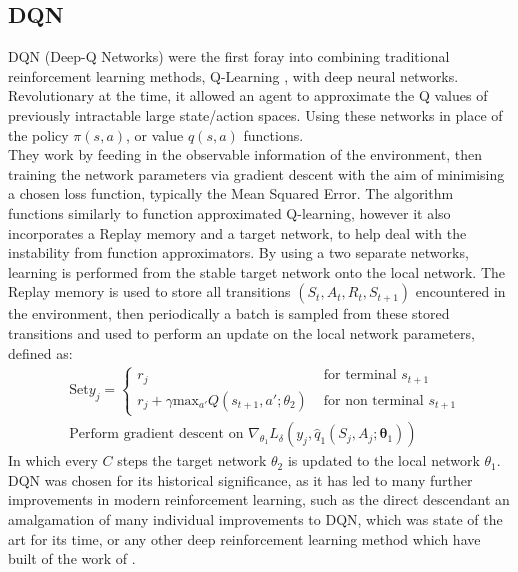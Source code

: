 \documentclass{article}
\begin{document}
\subsection{DQN}
DQN (Deep-Q Networks) \citep{dqn} were the first foray into combining traditional reinforcement learning methods, Q-Learning \citep{qlearning}, with deep neural networks. Revolutionary at the time, it allowed an agent to approximate the Q values of previously intractable large state/action spaces. Using these networks in place of the policy $\pi(s,a)$, or value $q(s,a)$ functions.\\\newline
They work by feeding in the observable information of the environment, then training the network parameters via gradient descent with the aim of minimising a chosen loss function, typically the Mean Squared Error. The algorithm functions similarly to function approximated Q-learning, however it also incorporates a Replay memory and a target network, to help deal with the instability from function approximators. By using a two separate networks, learning is performed from the stable target network onto the local network. The Replay memory is used to store all transitions $(S_{t},A_{t},R_{t},S_{t+1})$ encountered in the environment, then periodically a batch is sampled from these stored transitions and used to perform an update on the local network parameters, defined as:
\begin{equation}
\begin{aligned}
    &\text{Set} y_{j} = 
    \begin{cases}
    r_{j} & \text{ for terminal } s_{t+1}\\    
    r_{j} + \gamma\text{max}_{a'}Q(s_{t+1},a'; \theta_{2}) & \text{ for non terminal } s_{t+1}
    \end{cases}\\
    &\text{Perform gradient descent on } \nabla_{\theta_{1}}L_{\delta}(y_{j},\hat{q}_{1}(S_{j},A_{j};\boldsymbol{\theta}_{1}))
\end{aligned}
\end{equation}
In which every $C$ steps the target network $\theta_{2}$ is updated to the local network $\theta_{1}$.\\\newline
DQN was chosen for its historical significance, as it has led to many further improvements in modern reinforcement learning, such as the direct descendant \citet{rainbow} an amalgamation of many individual improvements to DQN, which was state of the art for its time, or any other deep reinforcement learning method which have built of the work of \citet{dqn}. 
\end{document}
